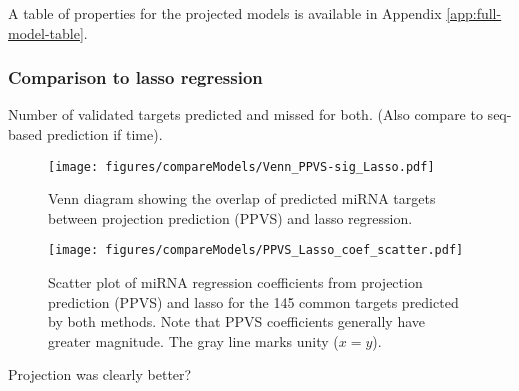 A table of properties for the projected models is available in Appendix
\ref{app:full-model-table}.


\subsubsection{Comparison to lasso regression}

Number of validated targets predicted and missed for both. (Also compare
to seq-based prediction if time).

\begin{figure}[htb]
  \centering
  \texttt{[image: figures/compareModels/Venn\_PPVS-sig\_Lasso.pdf]}
  \caption{Venn diagram showing the overlap of predicted miRNA targets
  between projection prediction (PPVS) and lasso regression.}
  \label{fig:venn-ppvs-lasso}
\end{figure}

\begin{figure}[htb]
  \centering
  \texttt{[image: figures/compareModels/PPVS\_Lasso\_coef\_scatter.pdf]}
  \caption{Scatter plot of miRNA regression coefficients from projection
  prediction (PPVS) and lasso for the 145 common targets predicted by both methods.
  Note that PPVS coefficients generally have greater magnitude. The gray
  line marks unity ($x=y$).}
  \label{fig:scatter-ppvs-lasso}
\end{figure}

Projection was clearly better?
